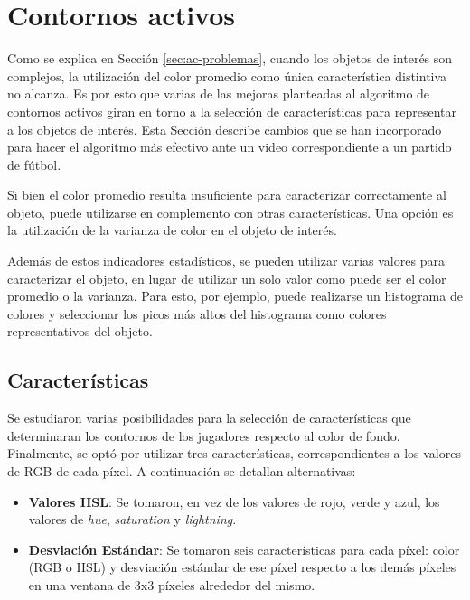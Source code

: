 \section{Contornos activos}
\label{sec:ac-extension}

Como se explica en Sección \ref{sec:ac-problemas}, cuando los objetos de
interés son complejos, la utilización del color promedio como única
característica distintiva no alcanza. Es por esto que varias de las mejoras
planteadas al algoritmo de contornos activos giran en torno a la selección de
características para representar a los objetos de interés. Esta Sección
describe cambios que se han incorporado para hacer el algoritmo más efectivo
ante un video correspondiente a un partido de fútbol.

Si bien el color promedio resulta insuficiente para caracterizar correctamente
al objeto, puede utilizarse en complemento con otras características. Una opción
es la utilización de la varianza de color en el objeto de interés.

Además de estos indicadores estadísticos, se pueden utilizar varias valores
para caracterizar el objeto, en lugar de utilizar un solo valor como puede ser
el color promedio o la varianza. Para esto, por ejemplo, puede realizarse un
histograma de colores y seleccionar los picos más altos del histograma como
colores representativos del objeto.

\subsection{Características}
\label{sec:caracteristicas}

Se estudiaron varias posibilidades para la selección de características que
determinaran los contornos de los jugadores respecto al color de fondo.
Finalmente, se optó por utilizar tres características, correspondientes a los
valores de RGB de cada píxel. A continuación se detallan alternativas:
\begin{itemize}
  \item \textbf{Valores HSL}: Se tomaron, en vez de los valores de rojo, verde
    y azul, los valores de \textit{hue}, \textit{saturation} y
    \textit{lightning}.

  \item \textbf{Desviación Estándar}: Se tomaron seis características para cada
    píxel: color (RGB o HSL) y desviación estándar de ese píxel respecto a los
    demás píxeles en una ventana de 3x3 píxeles alrededor del mismo.

\end{itemize}

